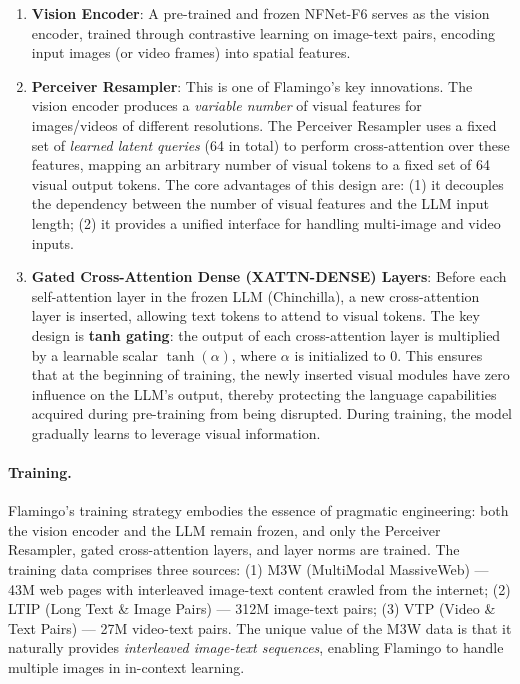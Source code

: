 \begin{enumerate}[leftmargin=2em]
  \item \textbf{Vision Encoder}:
    A pre-trained and frozen NFNet-F6 serves as the vision encoder,
    trained through contrastive learning on image-text pairs,
    encoding input images (or video frames) into spatial features.

  \item \textbf{Perceiver Resampler}:
    This is one of Flamingo's key innovations.
    The vision encoder produces a \textit{variable number} of visual features for images/videos of different resolutions.
    The Perceiver Resampler uses a fixed set of \textit{learned latent queries} (64 in total)
    to perform cross-attention over these features,
    mapping an arbitrary number of visual tokens to a fixed set of 64 visual output tokens.
    The core advantages of this design are:
    (1) it decouples the dependency between the number of visual features and the LLM input length;
    (2) it provides a unified interface for handling multi-image and video inputs.

  \item \textbf{Gated Cross-Attention Dense (XATTN-DENSE) Layers}:
    Before each self-attention layer in the frozen LLM (Chinchilla),
    a new cross-attention layer is inserted, allowing text tokens to attend to visual tokens.
    The key design is \textbf{tanh gating}:
    the output of each cross-attention layer is multiplied by a learnable scalar $\tanh(\alpha)$,
    where $\alpha$ is initialized to 0.
    This ensures that at the beginning of training, the newly inserted visual modules have zero influence on the LLM's output,
    thereby protecting the language capabilities acquired during pre-training from being disrupted.
    During training, the model gradually learns to leverage visual information.
\end{enumerate}

\paragraph{Training.}
Flamingo's training strategy embodies the essence of pragmatic engineering:
both the vision encoder and the LLM remain frozen,
and only the Perceiver Resampler, gated cross-attention layers, and layer norms are trained.
The training data comprises three sources:
(1) M3W (MultiModal MassiveWeb) --- 43M web pages with interleaved image-text content crawled from the internet;
(2) LTIP (Long Text \& Image Pairs) --- 312M image-text pairs;
(3) VTP (Video \& Text Pairs) --- 27M video-text pairs.
The unique value of the M3W data is that it naturally provides \textit{interleaved image-text sequences},
enabling Flamingo to handle multiple images in in-context learning.

